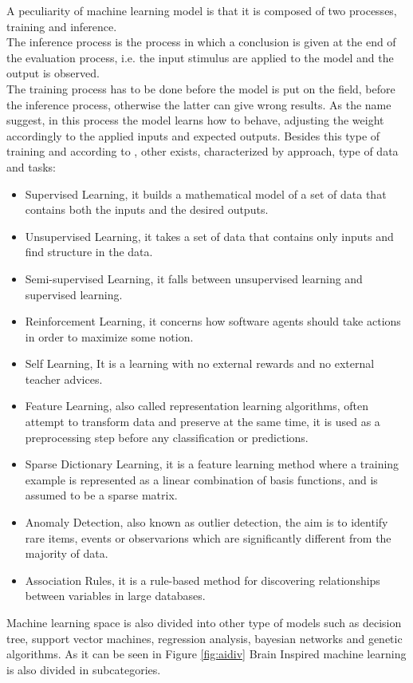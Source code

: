 A peculiarity of machine learning model is that it is composed of two processes, training and inference.\\
The inference process is the process in which a conclusion is given at the end of the evaluation process, i.e. the input stimulus are applied to the model and the output is observed.\\
The training process has to be done before the model is put on the field, before the inference process, otherwise the latter can give wrong results. As the name suggest, in this process the model learns how to behave, adjusting the weight accordingly to the applied inputs and expected outputs. Besides this type of training and according to \cite{book:1}, other exists, characterized by approach, type of data and tasks:
\begin{itemize}
\item Supervised Learning, it builds a mathematical model of a set of data that contains both the inputs and the desired outputs.
\item Unsupervised Learning, it takes a set of data that contains only inputs and find structure in the data.
\item Semi-supervised Learning, it falls between unsupervised learning and supervised learning.
\item Reinforcement Learning, it concerns how software agents should take actions in order to maximize some notion.
\item Self Learning, It is a learning with no external rewards and no external teacher advices.
\item Feature Learning, also called representation learning algorithms, often attempt to transform data and preserve at the same time, it is used as a preprocessing step before any classification or predictions.
\item Sparse Dictionary Learning, it is a feature learning method where a training example is represented as a linear combination of basis functions, and is assumed to be a sparse matrix.
\item Anomaly Detection, also known as outlier detection, 
the aim is to identify rare items, events or observarions which are significantly different from the majority of data.
\item Association Rules, it is a rule-based method for discovering relationships between variables in large databases.
\end{itemize}

Machine learning space is also divided into other type of models such as decision tree, support vector machines, regression analysis, bayesian networks and genetic algorithms.
As it can be seen in Figure \ref{fig:aidiv} Brain Inspired machine learning is also divided in subcategories.
